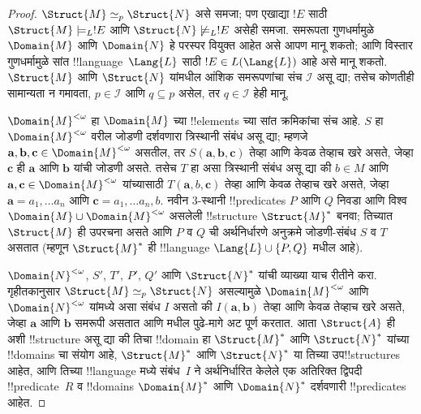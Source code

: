 \documentclass[../../../include/open-logic-section]{subfiles}
\begin{document}
\begin{proof}
$\Struct{M} \simeq_p \Struct{N}$ असे समजा; पण एखाद्या $!E$ साठी
$\Struct{M} \models_L !E$ आणि $\Struct{N} \not\models_L !E$ असेही
समजा. समरूपता गुणधर्मामुळे $\Domain{M}$ आणि $\Domain{N}$ हे परस्पर
वियुक्त आहेत असे आपण मानू शकतो; आणि विस्तार गुणधर्मामुळे सांत
!!{language}~$\Lang{L}$ साठी $!E \in L(\Lang{L})$ आहे असे मानू शकतो.
$\Struct{M}$ आणि $\Struct{N}$ यांमधील आंशिक समरूपणांचा संच
$\mathcal{I}$ असू द्या; तसेच कोणतीही सामान्यता न गमावता, $p \in
\mathcal{I}$ आणि $q \subseteq p$ असेल, तर $q \in \mathcal{I}$ हेही
मानू.

$\Domain{M}^{<\omega}$ हा $\Domain{M}$ च्या !!{element}s च्या सांत
क्रमिकांचा संच आहे. $S$ हा $\Domain{M}^{<\omega}$ वरील जोडणी दर्शवणारा
त्रिस्थानी संबंध असू द्या; म्हणजे $\mathbf{a}, \mathbf{b},
\mathbf{c} \in \Domain{M}^{<\omega}$ असतील, तर $S(\mathbf{a},
\mathbf{b}, \mathbf{c})$ तेव्हा आणि केवळ तेव्हाच खरे असते, जेव्हा
$\mathbf{c}$ ही $\mathbf{a}$ आणि $\mathbf{b}$ यांची जोडणी असते. तसेच
$T$ हा असा त्रिस्थानी संबंध असू द्या की $b \in M$ आणि
$\mathbf{a}, \mathbf{c} \in \Domain{M}^{<\omega}$ यांच्यासाठी
$T(\mathbf{a}, b, \mathbf{c})$ तेव्हा आणि केवळ तेव्हाच खरे असते,
जेव्हा $\mathbf{a} = a_1, \dots a_n$ आणि $\mathbf{c} = a_1, \dots
a_n, b$. नवीन 3-स्थानी !!{predicate}s $P$ आणि $Q$ निवडा आणि विश्व
$\Domain{M} \cup \Domain{M}^{<\omega}$ असलेली !!{structure}
$\Struct{M}^*$ बनवा; तिच्यात $\Struct{M}$ ही उपरचना असते आणि $P$ व
$Q$ ची अर्थनिर्धारणे अनुक्रमे जोडणी-संबंध $S$ व $T$ असतात (म्हणून
$\Struct{M}^*$ ही !!{language} $\Lang{L} \cup \{ P, Q\}$ मधील आहे).

$\Domain{N}^{<\omega}$, $S'$, $T'$, $P'$, $Q'$ आणि $\Struct{N}^*$
यांची व्याख्या याच रीतीने करा. गृहीतकानुसार $\Struct{M} \simeq_p
\Struct{N}$ असल्यामुळे $\Domain{M}^{<\omega}$ आणि
$\Domain{N}^{<\omega}$ यांमध्ये असा संबंध $I$ असतो की
$I(\mathbf{a}, \mathbf{b})$ तेव्हा आणि केवळ तेव्हाच खरे असते, जेव्हा
$\mathbf{a}$ आणि $\mathbf{b}$ समरूपी असतात आणि
 मधील पुढे-मागे अट पूर्ण करतात. आता
$\Struct{A}$ ही अशी !!{structure} असू द्या की तिचा !!{domain} हा
$\Struct{M}^*$ आणि $\Struct{N}^*$ यांच्या !!{domain}s चा संयोग आहे,
$\Struct{M}^*$ आणि $\Struct{N}^*$ या तिच्या उप!!{structure}s आहेत,
आणि तिच्या !!{language} मध्ये संबंध~$I$ ने अर्थनिर्धारित केलेले एक
अतिरिक्त द्विपदी !!{predicate}~$R$ व !!{domain}s $\Domain{M}^*$ आणि
$\Domain{N}^*$ दर्शवणारी !!{predicate}s आहेत.


\end{proof}
\end{document}
